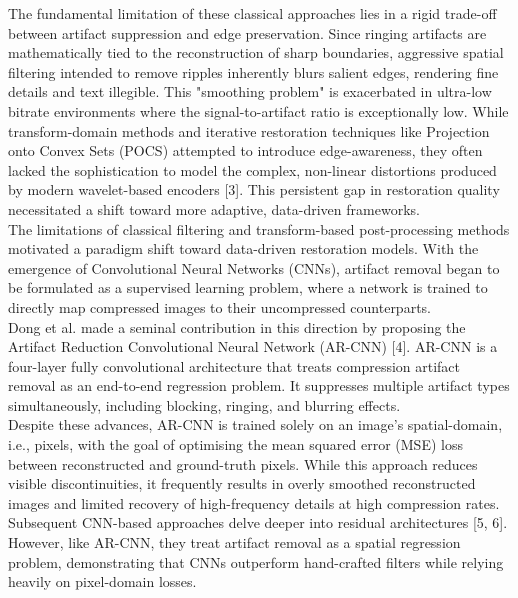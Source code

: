 \documentclass[12pt]{article}
\begin{document}
The fundamental limitation of these classical approaches lies in a rigid trade-off between artifact suppression and edge preservation. Since ringing artifacts are mathematically tied to the reconstruction of sharp boundaries, aggressive spatial filtering intended to remove ripples inherently blurs salient edges, rendering fine details and text illegible. This "smoothing problem" is exacerbated in ultra-low bitrate environments where the signal-to-artifact ratio is exceptionally low. While transform-domain methods and iterative restoration techniques like Projection onto Convex Sets (POCS) attempted to introduce edge-awareness, they often lacked the sophistication to model the complex, non-linear distortions produced by modern wavelet-based encoders [3]. This persistent gap in restoration quality necessitated a shift toward more adaptive, data-driven frameworks. \\

The limitations of classical filtering and transform-based post-processing methods motivated a paradigm shift toward data-driven restoration models. With the emergence of Convolutional Neural Networks (CNNs), artifact removal began to be formulated as a supervised learning problem, where a network is trained to directly map compressed images to their uncompressed counterparts. \\

Dong et al. made a seminal contribution in this direction by proposing the Artifact Reduction Convolutional Neural Network (AR-CNN) [4]. AR-CNN is a four-layer fully convolutional architecture that treats compression artifact removal as an end-to-end regression problem. It suppresses multiple artifact types simultaneously, including blocking, ringing, and blurring effects. \\

Despite these advances, AR-CNN is trained solely on an image’s spatial-domain, i.e., pixels, with the goal of optimising the mean squared error (MSE) loss between reconstructed and ground-truth pixels. While this approach reduces visible discontinuities, it frequently results in overly smoothed reconstructed images and limited recovery of high-frequency details at high compression rates.
Subsequent CNN-based approaches delve deeper into residual architectures [5, 6]. However, like AR-CNN, they treat artifact removal as a spatial regression problem, demonstrating that CNNs outperform hand-crafted filters while relying heavily on pixel-domain losses. \\
\end{document}
